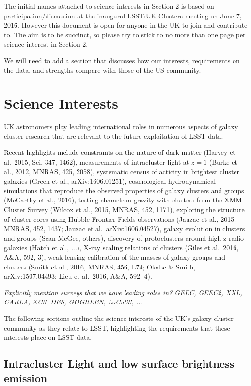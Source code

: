 \documentclass[a4paper,11pt]{article}
\begin{document}
The initial names attached to science interests in Section 2 is based
on participation/discussion at the inaugural LSST:UK Clusters meeting
on June 7, 2016.  However this document is open for anyone in the UK
to join and contribute to.  The aim is to be succinct, so please try
to stick to no more than one page per science interest in Section 2.

We will need to add a section that discusses how our interests,
requirements on the data, and strengths compare with those of the US
community.

\section{Science Interests}

UK astronomers play leading international roles in numerous aspects of
galaxy cluster research that are relevant to the future exploitation
of LSST data.  

Recent highlights include constraints on the nature of dark matter
(Harvey et al.\ 2015, Sci, 347, 1462), measurements of intracluster
light at $z=1$ (Burke et al., 2012, MNRAS, 425, 2058), systematic
census of acticity in brightest cluster galaxies (Green et al.,
arXiv:1606.01251), cosmological hydrodynamical simulations that
reproduce the observed properties of galaxy clusters and groups
(McCarthy et al., 2016), testing chameleon gravity with clusters from
the XMM Cluster Survey (Wilcox et al., 2015, MNRAS, 452, 1171),
exploring the structure of cluster cores using Hubble Frontier Fields
observations (Jauzac et al., 2015, MNRAS, 452, 1437; Jauzac et
al.\ arXiv:1606.04527), galaxy evolution in clusters and groups (Sean
McGee, others), discovery of protoclusters around high-z radio
galaxies (Hatch et al., ...), X-ray scaling relations of clusters
(Giles et al.\ 2016, A\&A, 592, 3), weak-lensing calibration of the
masses of galaxy groups and clusters (Smith et al., 2016, MNRAS, 456,
L74; Okabe \& Smith, arXiv:1507.04493; Lieu et al.\ 2016, A\&A, 592,
4).

\emph{Explicitly mention surveys that we have leading roles in?  GEEC,
  GEEC2, XXL, CARLA, XCS, DES, GOGREEN, LoCuSS, ...}

The following sections outline the science interests of the UK's
galaxy cluster community as they relate to LSST, highlighting the
requirements that these interests place on LSST data.

\subsection{Intracluster Light and low surface brightness emission}
\end{document}
